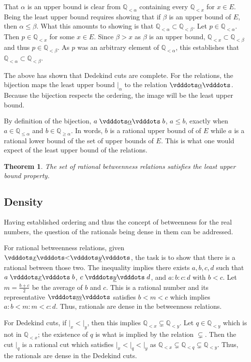 \documentclass[12pt]{article}
\newtheorem{theorem}{Theorem}[section]
\newcommand{\qcut}[2][x]{\ensuremath{\mathbb{Q}_{#2 #1}}}
\newcommand{\qlt}[1][x]{\qcut[#1]{<}}
\newcommand{\qgeq}[1][x]{\qcut[#1]{\geq}}
\newcommand{\qleq}[1][x]{\qcut[#1]{\leq}}
\newcommand{\cut}[1][x]{{\vert}_{#1} }
\newcommand{\yrel}{\xrel[y]}
\begin{document}
That $\alpha$ is an upper bound is clear from $\qlt[\alpha]$ containing every $\qlt$ for $x \in E$. Being the least upper bound requires showing that if $\beta$ is an upper bound of $E$, then $\alpha \leq \beta$. What this amounts to showing is that $\qlt[\alpha] \subset \qlt[\beta]$. Let $p \in \qlt[\alpha]$. Then $p \in \qlt$ for some $x \in E$. Since $\beta > x$ as $\beta$ is an upper bound, $\qlt \subset \qlt[\beta]$ and thus $p \in \qlt[\beta]$. As $p$ was an arbitrary element of $\qlt[\alpha]$, this  establishes that $\qlt[\alpha] \subset \qlt[\beta]$.

The above has shown that Dedekind cuts are complete. For the relations, the bijection  maps the least upper bound $\cut[\alpha]$ to the relation $\xrel[\alpha]$. Because the bijection respects the ordering, the image will be the least upper bound. 

By definition of the bijection, $a \xrel[\alpha] b$, $a \leq b$, exactly when $a \in \qleq [\alpha]$ and $b \in \qgeq[\alpha]$. In words, $b$ is a rational upper bound of of $E$ while $a$ is a rational lower bound of the set of upper bounds of $E$. This is what one would expect of the least upper bound of the relations. 

\begin{theorem}
    The set of rational betweenness relations satisfies the least upper bound property. 
\end{theorem}

\subsection{Density}

Having established ordering and thus the concept of betweenness for the real numbers, the question of the rationals being dense in them can be addressed.

For rational betweenness relations, given $\xrel < \yrel$, the task is to show that there is a rational between those two. The inequality implies there exists $a,b,c,d$ such that $a \xrel b$, $c \xrel[y] d$, and $a:b:c:d$ with $b < c$. Let $m = \frac{b+c}{2}$ be the average of $b$ and $c$. This is a rational number and its representative $\xrel[m]$ satisfies $b < m < c$ which implies $a:b < m:m < c:d$. Thus, rationals are dense in the betweenness relations. 

For Dedekind cuts, if $\cut < \cut[y]$, then this implies $\qlt \subsetneq \qlt[y]$. Let $q \in \qlt[y]$ which is not in $\qlt$; the existence of $q$ is what is implied by the relation $\subsetneq$. Then the cut $\cut[q]$ is a rational cut which satisfies $\cut < \cut[q] < \cut[y]$ as $\qlt \subsetneq \qlt[q] \subsetneq \qlt[y]$.  Thus, the rationals are dense in the Dedekind cuts. 
\end{document}
